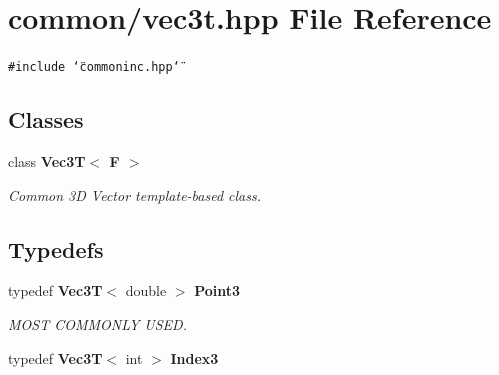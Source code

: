 \section{common/vec3t.hpp File Reference}
\label{vec3t_8hpp}


{\tt \#include \char`\"{}commoninc.hpp\char`\"{}}\par
\subsection*{Classes}
\begin{CompactItemize}
\item 
class {\bf Vec3T$<$ F $>$}
\begin{CompactList}\small\item\em Common 3D Vector template-based class. \item\end{CompactList}\end{CompactItemize}
\subsection*{Typedefs}
\begin{CompactItemize}
\item 
typedef {\bf Vec3T}$<$ double $>$ {\bf Point3}
\begin{CompactList}\small\item\em MOST COMMONLY USED. \item\end{CompactList}\item 
typedef {\bf Vec3T}$<$ int $>$ {\bf Index3}
\end{CompactItemize}
